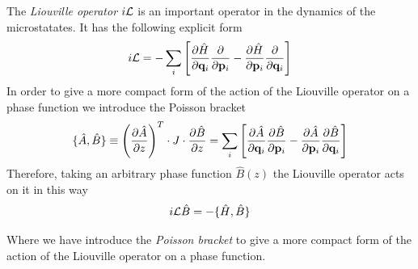 \documentclass[b5paper,openright,11pt]{book}
\begin{document}
The {\it Liouville operator} $i{\cal L}$ is an important operator in the dynamics of the microstatates. It has the following explicit form 
\begin{equation}
    i{\cal L} = -
    \sum_i\left[\frac{\partial \hat{H}}{\partial {\bf q}_i}
\frac{\partial    }{\partial {\bf p}_i}-
\frac{\partial \hat{H}}{\partial {\bf p}_i}
\frac{\partial }{\partial {\bf q}_i}\right]
\label{iL}
\end{equation}
In order to give a more compact form of the action of the Liouville operator on a phase function we introduce the Poisson bracket
\begin{align}
  \{\hat{A},\hat{B}\}\equiv\left(\frac{\partial\hat{A}}{\partial z}\right)^T\cdot J\cdot\frac{\partial\hat{B}}{\partial z}= 
  \sum_i\left[\frac{\partial \hat{A}}{\partial {\bf q}_i}
    \frac{\partial \hat{B}}{\partial {\bf p}_i}-          
    \frac{\partial \hat{A}}{\partial {\bf p}_i}
  \frac{\partial\hat{B} }{\partial {\bf q}_i}\right]
    \label{PoissonBracket}
\end{align}
Therefore, taking an arbitrary phase function $\hat{B}(z)$ the Liouville operator acts on it in this way
\begin{equation}
  i{\cal L}\hat{B} 
  = -\{\hat{H},\hat{B}\}
\label{iL}
\end{equation}

Where we have introduce the {\it Poisson bracket} to give a more compact form of the action of the Liouville operator on a phase function. 
\end{document}
